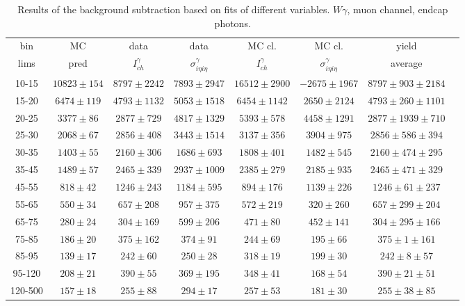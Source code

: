 \begin{table}[h]
  \tiny
  \begin{center}
  \caption{Results of the background subtraction based on fits of different variables. $W\gamma$, muon channel, endcap photons.}
  \begin{tabular}{|c|c|c|c|c|c|c|c|}
    bin &  MC   & data  & data  & MC cl. & MC cl. & yield \\ 
    lims & pred & $I_{ch}^{\gamma}$ & $\sigma_{i\eta i\eta}^\gamma$  & $I_{ch}^{\gamma}$  & $\sigma_{i\eta i\eta}^\gamma$   & average\\ \hline
    10-15 & $10823\pm154$ & $8797\pm2242$ & $7893\pm2947$ & $16512\pm2900$ & $-2675\pm1967$ &$8797\pm903\pm2184$  \\ \hline
    15-20 & $6474\pm119$ & $4793\pm1132$ & $5053\pm1518$ & $6454\pm1142$ & $2650\pm2124$ &$4793\pm260\pm1101$  \\ \hline
    20-25 & $3377\pm86$ & $2877\pm729$ & $4817\pm1329$ & $5393\pm578$ & $4458\pm1291$ &$2877\pm1939\pm710$  \\ \hline
    25-30 & $2068\pm67$ & $2856\pm408$ & $3443\pm1514$ & $3137\pm356$ & $3904\pm975$ &$2856\pm586\pm394$  \\ \hline
    30-35 & $1403\pm55$ & $2160\pm306$ & $1686\pm693$ & $1808\pm401$ & $1482\pm545$ &$2160\pm474\pm295$  \\ \hline
    35-45 & $1489\pm57$ & $2465\pm339$ & $2937\pm1009$ & $2385\pm279$ & $2185\pm935$ &$2465\pm471\pm329$  \\ \hline
    45-55 & $818\pm42$ & $1246\pm243$ & $1184\pm595$ & $894\pm176$ & $1139\pm226$ &$1246\pm61\pm237$  \\ \hline
    55-65 & $550\pm34$ & $657\pm208$ & $957\pm375$ & $572\pm219$ & $320\pm260$ &$657\pm299\pm204$  \\ \hline
    65-75 & $280\pm24$ & $304\pm169$ & $599\pm206$ & $471\pm80$ & $452\pm141$ &$304\pm295\pm166$  \\ \hline
    75-85 & $186\pm20$ & $375\pm162$ & $374\pm91$ & $244\pm69$ & $195\pm66$ &$375\pm1\pm161$  \\ \hline
    85-95 & $139\pm17$ & $242\pm60$ & $250\pm28$ & $318\pm19$ & $199\pm30$ &$242\pm8\pm57$  \\ \hline
    95-120 & $208\pm21$ & $390\pm55$ & $369\pm195$ & $348\pm41$ & $168\pm54$ &$390\pm21\pm51$  \\ \hline
    120-500 & $157\pm18$ & $255\pm88$ & $294\pm17$ & $257\pm53$ & $181\pm30$ &$255\pm38\pm85$  \\ \hline
  \end{tabular}
  \label{tab:diff_ways_to_fit_phoEt_ENDCAP_muon}
  \end{center}
\end{table}

